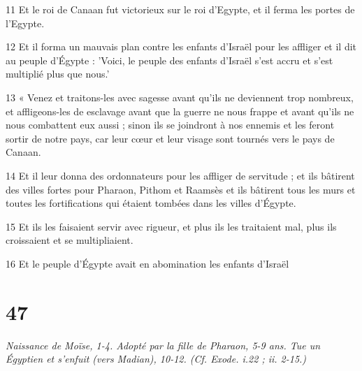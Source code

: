 \par 11 Et le roi de Canaan fut victorieux sur le roi d'Egypte, et il ferma les portes de l'Egypte.
\par 12 Et il forma un mauvais plan contre les enfants d'Israël pour les affliger et il dit au peuple d'Égypte : 'Voici, le peuple des enfants d'Israël s'est accru et s'est multiplié plus que nous.'
\par 13 « Venez et traitons-les avec sagesse avant qu'ils ne deviennent trop nombreux, et affligeons-les de esclavage avant que la guerre ne nous frappe et avant qu'ils ne nous combattent eux aussi ; sinon ils se joindront à nos ennemis et les feront sortir de notre pays, car leur cœur et leur visage sont tournés vers le pays de Canaan.
\par 14 Et il leur donna des ordonnateurs pour les affliger de servitude ; et ils bâtirent des villes fortes pour Pharaon, Pithom et Raamsès et ils bâtirent tous les murs et toutes les fortifications qui étaient tombées dans les villes d'Égypte.
\par 15 Et ils les faisaient servir avec rigueur, et plus ils les traitaient mal, plus ils croissaient et se multipliaient.
\par 16 Et le peuple d'Égypte avait en abomination les enfants d'Israël

\chapter{47}

\par \textit{Naissance de Moïse, 1-4. Adopté par la fille de Pharaon, 5-9 ans. Tue un Égyptien et s'enfuit (vers Madian), 10-12. (Cf. Exode. i.22 ; ii. 2-15.)}

